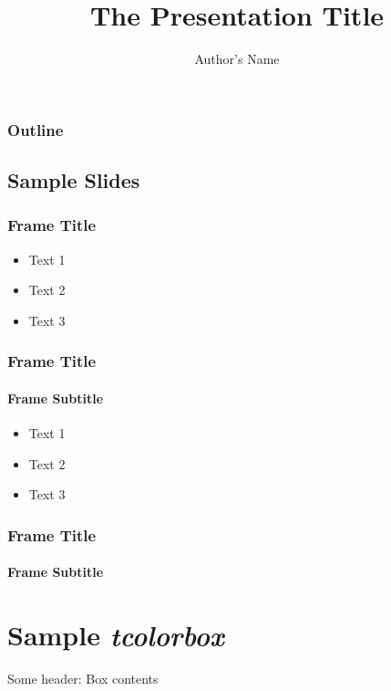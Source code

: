 \documentclass[xcolor={dvipsnames},10pt]{beamer}
\title{The Presentation Title}
\author{Author's Name}
\begin{document}
\setlength{\abovedisplayskip}{3pt}
\setlength{\belowdisplayskip}{3pt}

\begin{frame}
    \titlepage
\end{frame}


\begin{frame}
    \frametitle{Outline}
    \begin{multicols}{2}
        \tableofcontents
    \end{multicols}
\end{frame}

\begin{frame}
\section{Sample Slides}
\frametitle{Frame Title}
    \begin{itemize}
    \item Text 1
    \item Text 2
    \item Text 3
    \end{itemize}   
\end{frame}

\begin{frame}
    \frametitle{Frame Title}
    \framesubtitle{Frame Subtitle}

    \begin{itemize}
        \item Text 1
        \item Text 2
        \item Text 3
    \end{itemize}

\end{frame}

\begin{frame}
    \frametitle{Frame Title}
    \framesubtitle{Frame Subtitle}
    \section{Sample \textit{tcolorbox}}
    \begin{tcolorbox}
        Some header: 
        \tcblower
        Box contents
    \end{tcolorbox}
\end{frame}
\end{document}

